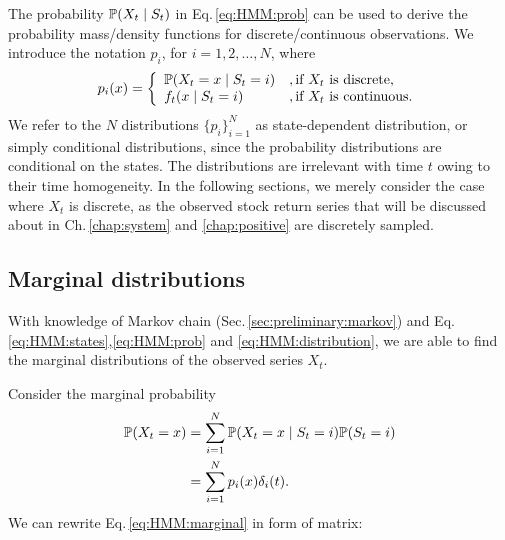 The probability $\mathbb{P}(X_t \mid S_t)$ in Eq.\,\ref{eq:HMM:prob} 
can be used to derive the probability mass/density functions for discrete/continuous observations.
We introduce the notation $p_i$, for $i = 1,2,\dots,N$, where
		\begin{equation}
        \label{eq:HMM:distribution}
        p_i(x) = \left \{ 
        \begin{array}{l l}
        \mathbb{P}(X_t = x \mid S_t = i) & ,\text{if}\ X_t\ \text{is discrete,} \\
        f_t(x \mid S_t = i) & ,\text{if}\ X_t\ \text{is continuous.} \\
        \end{array} \right.
        \end{equation}
We refer to the $N$ distributions $\{p_i\}_{i=1}^{N}$ as state-dependent distribution, 
or simply conditional distributions, 
since the probability distributions are conditional on the states.
The distributions are irrelevant with time $t$ owing to their time homogeneity.
In the following sections,
we merely consider the case where $X_t$ is discrete,
as the observed stock return series that will be discussed about 
in Ch.\,\ref{chap:system} and \ref{chap:positive} are discretely sampled.


\subsection{Marginal distributions}
\label{sec:HMM:overview:distribution}
With knowledge of Markov chain (Sec.\,\ref{sec:preliminary:markov}) and 
Eq.\,\ref{eq:HMM:states},\ref{eq:HMM:prob} and \ref{eq:HMM:distribution},
we are able to find the marginal distributions of the observed series $X_t$.


Consider the marginal probability
		\begin{equation}
		\label{eq:HMM:marginal}
		\begin{aligned}
		\mathbb{P}(X_t = x) & = \sum_{i=1}^{N} \mathbb{P}(X_t = x \mid S_t = i)\mathbb{P}(S_t = i) \\
		& = \sum_{i=1}^N p_i(x)\delta_i(t).
        \end{aligned}
        \end{equation}
We can rewrite Eq.\,\ref{eq:HMM:marginal} in form of matrix:

